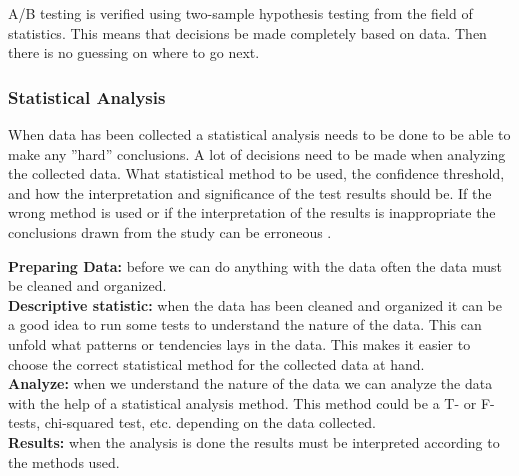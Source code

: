 A/B testing is verified using two-sample hypothesis testing from the field of statistics. This means that decisions be made completely based on data. Then there is no guessing on where to go next.




\subsubsection{Statistical Analysis}%
\label{sub:Statistical analysis}
When data has been collected a statistical analysis needs to be done to be able to make any ''hard'' conclusions. A lot of decisions need to be made when analyzing the collected data. What statistical method to be used, the confidence threshold, and how the interpretation and significance of the test results should be. If the wrong method is used or if the interpretation of the results is inappropriate the conclusions drawn from the study can be erroneous \cite{lazar2017research}. 


\textbf{Preparing Data:} before we can do anything with the data often the data must be cleaned and organized.\\
\textbf{Descriptive statistic:} when the data has been cleaned and organized it can be a good idea to run some tests to understand the nature of the data. This can unfold what patterns or tendencies lays in the data. This makes it easier to choose the correct statistical method for the collected data at hand.\\
\textbf{Analyze:} when we understand the nature of the data we can analyze the data with the help of a statistical analysis method. This method could be a T- or F-tests, chi-squared test, etc. depending on the data collected.\\ 
\textbf{Results:} when the analysis is done the results must be interpreted according to the methods used.\\




